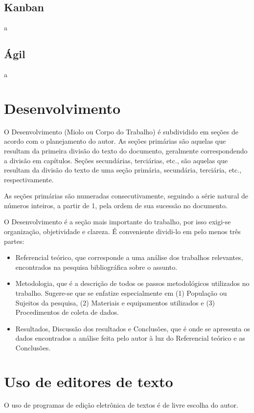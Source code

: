 \subsection{Kanban}
\label{sec:kanban}
a

\subsection{Ágil}
\label{sec:agil}
a















\section{Desenvolvimento}

O Desenvolvimento (Miolo ou Corpo do Trabalho) é subdividido em seções de 
acordo com o planejamento do autor. As seções primárias são aquelas que 
resultam da primeira divisão do texto do documento, geralmente 
correspondendo a divisão em capítulos. Seções secundárias, terciárias, 
etc., são aquelas que resultam da divisão do texto de uma seção primária, 
secundária, terciária, etc., respectivamente.

As seções primárias são numeradas consecutivamente, seguindo a série 
natural de números inteiros, a partir de 1, pela ordem de sua sucessão no 
documento.

O Desenvolvimento é a seção mais importante do trabalho, por isso exigi-se 
organização, objetividade e clareza. É conveniente dividi-lo em pelo menos 
três partes:

\begin{itemize}

	\item Referencial teórico, que corresponde a uma análise dos trabalhos 
	relevantes, encontrados na pesquisa bibliográfica sobre o assunto. 
	\item Metodologia, que é a descrição de todos os passos metodológicos 
	utilizados no trabalho. Sugere-se que se enfatize especialmente em (1) 
	População ou Sujeitos da pesquisa, (2) Materiais e equipamentos 
	utilizados e (3) Procedimentos de coleta de dados.
	\item Resultados, Discussão dos resultados e Conclusões, que é onde se 
	apresenta os dados encontrados a análise feita pelo autor à luz do 
	Referencial teórico e as Conclusões.

\end{itemize}

\section{Uso de editores de texto}

O uso de programas de edição eletrônica de textos é de livre escolha do autor. 

